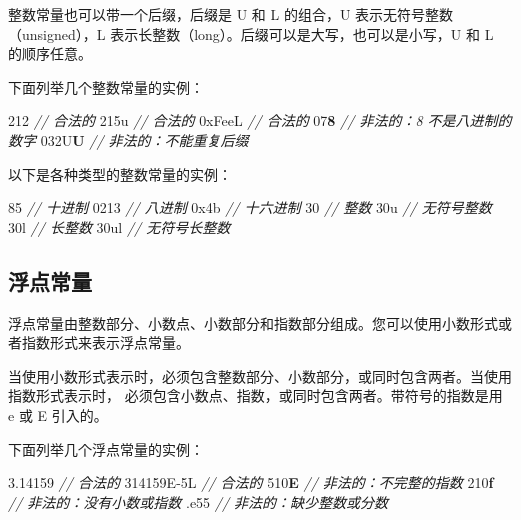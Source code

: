 \documentclass[
]{article}
\newenvironment{Shaded}{}{}
\newcommand{\BaseNTok}[1]{\textcolor[rgb]{0.25,0.63,0.44}{#1}}
\newcommand{\BuiltInTok}[1]{#1}
\newcommand{\CommentTok}[1]{\textcolor[rgb]{0.38,0.63,0.69}{\textit{#1}}}
\newcommand{\DecValTok}[1]{\textcolor[rgb]{0.25,0.63,0.44}{#1}}
\newcommand{\ErrorTok}[1]{\textcolor[rgb]{1.00,0.00,0.00}{\textbf{#1}}}
\newcommand{\FloatTok}[1]{\textcolor[rgb]{0.25,0.63,0.44}{#1}}
\newcommand{\NormalTok}[1]{#1}
\newcommand{\OperatorTok}[1]{\textcolor[rgb]{0.40,0.40,0.40}{#1}}
\begin{document}
整数常量也可以带一个后缀，后缀是 U 和 L 的组合，U
表示无符号整数（unsigned），L
表示长整数（long）。后缀可以是大写，也可以是小写，U 和 L 的顺序任意。

下面列举几个整数常量的实例：

\begin{Shaded}
\begin{Highlighting}[]
\DecValTok{212}         \CommentTok{// 合法的}
\DecValTok{215}\BuiltInTok{u}        \CommentTok{// 合法的}
\BaseNTok{0xFee}\BuiltInTok{L}      \CommentTok{// 合法的}
\BaseNTok{07}\ErrorTok{8}         \CommentTok{// 非法的：8 不是八进制的数字}
\BaseNTok{032}\BuiltInTok{U}\ErrorTok{U}       \CommentTok{// 非法的：不能重复后缀}
\end{Highlighting}
\end{Shaded}

以下是各种类型的整数常量的实例：

\begin{Shaded}
\begin{Highlighting}[]
\DecValTok{85}         \CommentTok{// 十进制}
\BaseNTok{0213}       \CommentTok{// 八进制 }
\BaseNTok{0x4b}       \CommentTok{// 十六进制 }
\DecValTok{30}         \CommentTok{// 整数 }
\DecValTok{30}\BuiltInTok{u}        \CommentTok{// 无符号整数 }
\DecValTok{30}\BuiltInTok{l}        \CommentTok{// 长整数 }
\DecValTok{30}\BuiltInTok{ul}       \CommentTok{// 无符号长整数}
\end{Highlighting}
\end{Shaded}

\hypertarget{ux6d6eux70b9ux5e38ux91cf}{%
\subsection{浮点常量}\label{ux6d6eux70b9ux5e38ux91cf}}

浮点常量由整数部分、小数点、小数部分和指数部分组成。您可以使用小数形式或者指数形式来表示浮点常量。

当使用小数形式表示时，必须包含整数部分、小数部分，或同时包含两者。当使用指数形式表示时，
必须包含小数点、指数，或同时包含两者。带符号的指数是用 e 或 E 引入的。

下面列举几个浮点常量的实例：

\begin{Shaded}
\begin{Highlighting}[]
\FloatTok{3.14159}       \CommentTok{// 合法的 }
\FloatTok{314159E{-}5}\BuiltInTok{L}    \CommentTok{// 合法的 }
\DecValTok{510}\ErrorTok{E}          \CommentTok{// 非法的：不完整的指数}
\DecValTok{210}\ErrorTok{f}          \CommentTok{// 非法的：没有小数或指数}
\OperatorTok{.}\NormalTok{e55          }\CommentTok{// 非法的：缺少整数或分数}
\end{Highlighting}
\end{Shaded}
\end{document}
